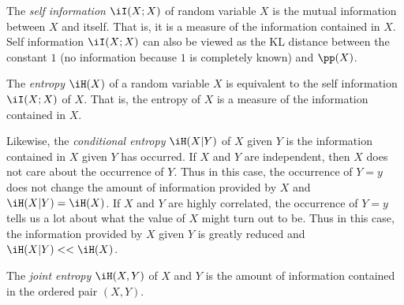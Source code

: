 The {\em self information} $\iI(X;X)$ of random variable $X$ is the 
mutual information between $X$ and itself.
That is, it is a measure of the information contained in $X$.
Self information $\iI(X;X)$ can also be viewed as the KL distance between
the constant $1$ (no information because $1$ is completely known)
and $\pp(X)$.
\begin{definition}
\label{def:I(X;X)}
\end{definition}

The {\em entropy} $\iH(X)$ of a random variable $X$ is equivalent to
the self information $\iI(X;X)$ of $X$.
That is, the entropy of $X$ is a measure of the information contained
in $X$.

Likewise, the {\em conditional entropy} $\iH(X|Y)$ 
of $X$ given $Y$ is the information
contained in $X$ given $Y$ has occurred. 
If $X$ and $Y$ are independent, then $X$ does not care about the occurrence of
$Y$. Thus in this case, 
the occurrence of $Y=y$ does not change the amount of information
provided by $X$ and $\iH(X|Y)=\iH(X)$.
If $X$ and $Y$ are highly correlated, 
the occurrence of $Y=y$ tells us a lot about what the value of $X$ might
turn out to be.
Thus in this case, the information provided by $X$ given $Y$ is greatly reduced
and $\iH(X|Y)<<\iH(X)$.

The {\em joint entropy} $\iH(X,Y)$ of $X$ and $Y$ is the amount of information 
contained in the ordered pair $(X,Y)$.

\begin{definition}[Entropy]
\label{def:H(X)}
\label{def:H(X|Y)}
\end{definition}



